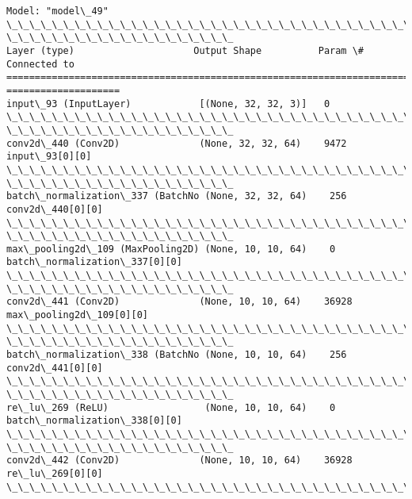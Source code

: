 \documentclass[11pt]{article}
\begin{document}
    \begin{Verbatim}[commandchars=\\\{\}]
Model: "model\_49"
\_\_\_\_\_\_\_\_\_\_\_\_\_\_\_\_\_\_\_\_\_\_\_\_\_\_\_\_\_\_\_\_\_\_\_\_\_\_\_\_\_\_\_\_\_\_\_\_\_\_\_\_\_\_\_\_\_\_\_\_\_\_\_\_\_\_\_\_\_\_\_\_\_\_\_\_\_\_\_\_
\_\_\_\_\_\_\_\_\_\_\_\_\_\_\_\_\_\_\_\_
Layer (type)                     Output Shape          Param \#     Connected to
================================================================================
====================
input\_93 (InputLayer)            [(None, 32, 32, 3)]   0
\_\_\_\_\_\_\_\_\_\_\_\_\_\_\_\_\_\_\_\_\_\_\_\_\_\_\_\_\_\_\_\_\_\_\_\_\_\_\_\_\_\_\_\_\_\_\_\_\_\_\_\_\_\_\_\_\_\_\_\_\_\_\_\_\_\_\_\_\_\_\_\_\_\_\_\_\_\_\_\_
\_\_\_\_\_\_\_\_\_\_\_\_\_\_\_\_\_\_\_\_
conv2d\_440 (Conv2D)              (None, 32, 32, 64)    9472
input\_93[0][0]
\_\_\_\_\_\_\_\_\_\_\_\_\_\_\_\_\_\_\_\_\_\_\_\_\_\_\_\_\_\_\_\_\_\_\_\_\_\_\_\_\_\_\_\_\_\_\_\_\_\_\_\_\_\_\_\_\_\_\_\_\_\_\_\_\_\_\_\_\_\_\_\_\_\_\_\_\_\_\_\_
\_\_\_\_\_\_\_\_\_\_\_\_\_\_\_\_\_\_\_\_
batch\_normalization\_337 (BatchNo (None, 32, 32, 64)    256
conv2d\_440[0][0]
\_\_\_\_\_\_\_\_\_\_\_\_\_\_\_\_\_\_\_\_\_\_\_\_\_\_\_\_\_\_\_\_\_\_\_\_\_\_\_\_\_\_\_\_\_\_\_\_\_\_\_\_\_\_\_\_\_\_\_\_\_\_\_\_\_\_\_\_\_\_\_\_\_\_\_\_\_\_\_\_
\_\_\_\_\_\_\_\_\_\_\_\_\_\_\_\_\_\_\_\_
max\_pooling2d\_109 (MaxPooling2D) (None, 10, 10, 64)    0
batch\_normalization\_337[0][0]
\_\_\_\_\_\_\_\_\_\_\_\_\_\_\_\_\_\_\_\_\_\_\_\_\_\_\_\_\_\_\_\_\_\_\_\_\_\_\_\_\_\_\_\_\_\_\_\_\_\_\_\_\_\_\_\_\_\_\_\_\_\_\_\_\_\_\_\_\_\_\_\_\_\_\_\_\_\_\_\_
\_\_\_\_\_\_\_\_\_\_\_\_\_\_\_\_\_\_\_\_
conv2d\_441 (Conv2D)              (None, 10, 10, 64)    36928
max\_pooling2d\_109[0][0]
\_\_\_\_\_\_\_\_\_\_\_\_\_\_\_\_\_\_\_\_\_\_\_\_\_\_\_\_\_\_\_\_\_\_\_\_\_\_\_\_\_\_\_\_\_\_\_\_\_\_\_\_\_\_\_\_\_\_\_\_\_\_\_\_\_\_\_\_\_\_\_\_\_\_\_\_\_\_\_\_
\_\_\_\_\_\_\_\_\_\_\_\_\_\_\_\_\_\_\_\_
batch\_normalization\_338 (BatchNo (None, 10, 10, 64)    256
conv2d\_441[0][0]
\_\_\_\_\_\_\_\_\_\_\_\_\_\_\_\_\_\_\_\_\_\_\_\_\_\_\_\_\_\_\_\_\_\_\_\_\_\_\_\_\_\_\_\_\_\_\_\_\_\_\_\_\_\_\_\_\_\_\_\_\_\_\_\_\_\_\_\_\_\_\_\_\_\_\_\_\_\_\_\_
\_\_\_\_\_\_\_\_\_\_\_\_\_\_\_\_\_\_\_\_
re\_lu\_269 (ReLU)                 (None, 10, 10, 64)    0
batch\_normalization\_338[0][0]
\_\_\_\_\_\_\_\_\_\_\_\_\_\_\_\_\_\_\_\_\_\_\_\_\_\_\_\_\_\_\_\_\_\_\_\_\_\_\_\_\_\_\_\_\_\_\_\_\_\_\_\_\_\_\_\_\_\_\_\_\_\_\_\_\_\_\_\_\_\_\_\_\_\_\_\_\_\_\_\_
\_\_\_\_\_\_\_\_\_\_\_\_\_\_\_\_\_\_\_\_
conv2d\_442 (Conv2D)              (None, 10, 10, 64)    36928
re\_lu\_269[0][0]
\_\_\_\_\_\_\_\_\_\_\_\_\_\_\_\_\_\_\_\_\_\_\_\_\_\_\_\_\_\_\_\_\_\_\_\_\_\_\_\_\_\_\_\_\_\_\_\_\_\_\_\_\_\_\_\_\_\_\_\_\_\_\_\_\_\_\_\_\_\_\_\_\_\_\_\_\_\_\_\_

\end{Verbatim}
\end{document}
